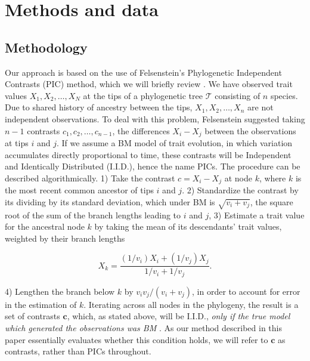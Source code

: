 \documentclass[12pt]{article}
\begin{document}
\section{Methods and data}

\subsection{Methodology}

Our approach is based on the use of Felsenstein's  Phylogenetic Independent Contrasts (PIC) method, which we will briefly review \citep[for more details, see][]{Felsenstein1985, Rohlf2001, Blomberg2012}. We have observed trait values $X_1, X_2, \ldots, X_N$ at the tips of a phylogenetic tree $\mathcal{T}$ consisting of $n$ species. Due to shared history of ancestry between the tips, $X_1, X_2, \ldots, X_n$ are not independent observations. To deal with this problem, Felsenstein suggested taking $n-1$ contrasts $c_1, c_2, \ldots, c_{n-1}$, the differences $X_{i} - X_{j}$ between the observations at tips $i$ and $j$. If we assume a BM model of trait evolution, in which variation accumulates directly proportional to time, these contrasts will be Independent and Identically Distributed (I.I.D.), hence the name PICs. The procedure can be described algorithmically. 1) Take the contrast $c = X_i - X_j$ at node $k$, where $k$ is the most recent common ancestor of tips $i$ and $j$. 2) Standardize the contrast by its dividing by its standard deviation, which under BM is $\sqrt{v_i + v_j}$, the square root of the sum of the branch lengths leading to $i$ and $j$, 3) Estimate a trait value for the ancestral node $k$ by taking the mean of its descendants' trait values, weighted by their branch lengths

\begin{equation}
X_k = \frac{(1 / v_i)X_i + (1 / v_j)X_j}{1/v_i + 1/v_j}.
\end{equation}

4) Lengthen the branch below $k$ by $v_i v_j / (v_i + v_j)$, in order to account for error in the estimation of $k$. Iterating across all nodes in the phylogeny, the result is a set of contrasts $\mathbf{c}$, which, as stated above, will be I.I.D., \textit{only if the true model which generated the observations was BM} \citep{Rohlf2001}. As our method described in this paper essentially evaluates whether this condition holds, we will refer to $\mathbf{c}$ as contrasts, rather than PICs throughout. 
\end{document}
